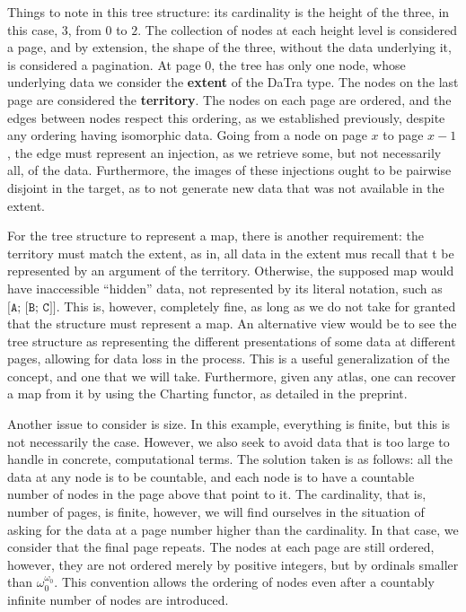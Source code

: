 \documentclass[11pt]{article}
\newcommand{\code}[1]{\texttt{#1}}
\begin{document}
Things to note in this tree structure: its cardinality is the height of the
three, in this case, \(3\), from \(0\) to \(2\). The collection of nodes at
each height level is considered a page, and by extension, the shape of the
three, without the data underlying it, is considered a pagination. At page
\(0\), the tree has only one node, whose underlying data we consider the
\textbf{extent} of the DaTra type. The nodes on the last page are considered
the \textbf{territory}. The nodes on each page are ordered, and the edges
between nodes respect this ordering, as we established previously, despite
any ordering having isomorphic data. Going from a node on page \(x\) to page
\(x - 1\), the edge must represent an injection, as we retrieve some, but
not necessarily all, of the data. Furthermore, the images of these
injections ought to be pairwise disjoint in the target, as to not generate
new data that was not available in the extent.

For the tree structure to represent a map, there is another requirement: the
territory must match the extent, as in, all data in the extent mus recall
that t be represented by an argument of the territory. Otherwise, the
supposed map would have inaccessible ``hidden'' data, not represented by its
literal notation, such as \(\code{[A; [B; C]]}\). This is, however,
completely fine, as long as we do not take for granted that the structure
must represent a map. An alternative view would be to see the tree structure
as representing the different presentations of some data at different
pages, allowing for data loss in the process. This is a useful generalization
of the concept, and one that we will take. Furthermore, given any atlas, one
can recover a map from it by using the Charting functor, as detailed in the
preprint.

Another issue to consider is size. In this example, everything is finite,
but this is not necessarily the case. However, we also seek to avoid data
that is too large to handle in concrete, computational terms. The solution
taken is as follows: all the data at any node is to be countable, and each
node is to have a countable number of nodes in the page above that point to
it. The cardinality, that is, number of pages, is finite, however, we will
find ourselves in the situation of asking for the data at a page number
higher than the cardinality. In that case, we consider that the final page
repeats. The nodes at each page are still ordered, however, they are not
ordered merely by positive integers, but by ordinals smaller than
\(\omega_0^{\omega_0}\). This convention allows the ordering of nodes even
after a countably infinite number of nodes are introduced.
\end{document}
